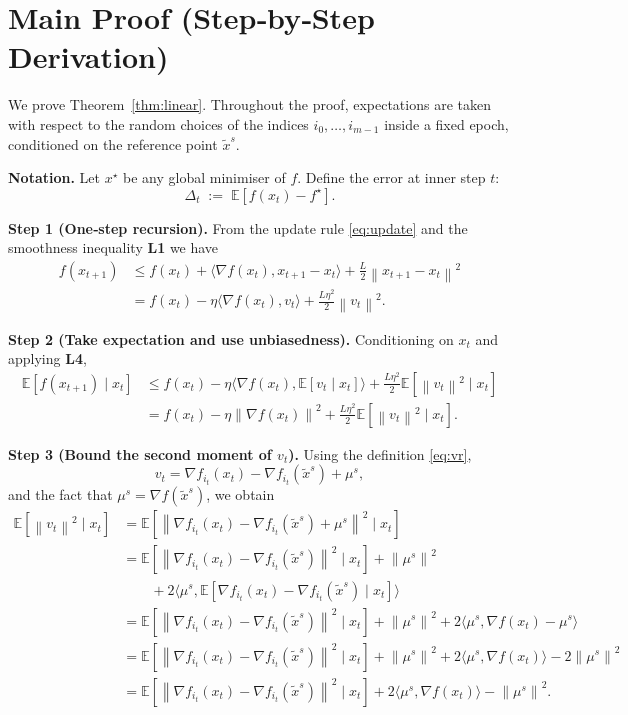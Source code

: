 \documentclass{article}
\newcommand{\E}{\mathbb{E}}
\newcommand{\norm}[1]{\left\|#1\right\|}
\newcommand{\inner}[2]{\langle #1,#2\rangle}
\newcommand{\grad}{\nabla}
\begin{document}
\section*{Main Proof (Step‑by‑Step Derivation)}
We prove Theorem~\ref{thm:linear}.  Throughout the proof, expectations are taken with respect to the random choices of the indices $i_0,\dots,i_{m-1}$ inside a fixed epoch, conditioned on the reference point $\tilde x^{s}$.

\bigskip
\noindent\textbf{Notation.}  Let $x^{\star}$ be any global minimiser of $f$.  Define the error at inner step $t$:
\[
\Delta_t \;:=\; \E\!\left[ f(x_t)-f^{\star}\right].
\]

\bigskip
\noindent\textbf{Step 1 (One‑step recursion).}  
From the update rule \eqref{eq:update} and the smoothness inequality \textbf{L1} we have
\[
\begin{aligned}
f(x_{t+1})
&\le f(x_t)+\inner{\grad f(x_t)}{x_{t+1}-x_t}
   +\frac{L}{2}\norm{x_{t+1}-x_t}^{2}\\
&= f(x_t)-\eta\inner{\grad f(x_t)}{v_t}
   +\frac{L\eta^{2}}{2}\norm{v_t}^{2}.
\end{aligned}
\tag{Step 1}
\]

\bigskip
\noindent\textbf{Step 2 (Take expectation and use unbiasedness).}  
Conditioning on $x_t$ and applying \textbf{L4},
\[
\begin{aligned}
\E\!\left[f(x_{t+1})\mid x_t\right]
&\le f(x_t)-\eta\inner{\grad f(x_t)}{\E[v_t\mid x_t]}
   +\frac{L\eta^{2}}{2}\E\!\left[\norm{v_t}^{2}\mid x_t\right]\\
&= f(x_t)-\eta\norm{\grad f(x_t)}^{2}
   +\frac{L\eta^{2}}{2}\E\!\left[\norm{v_t}^{2}\mid x_t\right].
\end{aligned}
\tag{Step 2}
\]

\bigskip
\noindent\textbf{Step 3 (Bound the second moment of $v_t$).}  
Using the definition \eqref{eq:vr},
\[
v_t = \grad f_{i_t}(x_t)-\grad f_{i_t}(\tilde x^{s})+\mu^{s},
\]
and the fact that $\mu^{s}= \grad f(\tilde x^{s})$, we obtain
\[
\begin{aligned}
\E\!\left[\norm{v_t}^{2}\mid x_t\right]
&= \E\!\left[\norm{\grad f_{i_t}(x_t)-\grad f_{i_t}(\tilde x^{s})+\mu^{s}}^{2}\mid x_t\right]\\
&= \E\!\left[\norm{\grad f_{i_t}(x_t)-\grad f_{i_t}(\tilde x^{s})}^{2}\mid x_t\right]
   +\norm{\mu^{s}}^{2}\\
&\qquad +2\inner{\mu^{s}}{\E\!\left[\grad f_{i_t}(x_t)-\grad f_{i_t}(\tilde x^{s})\mid x_t\right]}\\
&= \E\!\left[\norm{\grad f_{i_t}(x_t)-\grad f_{i_t}(\tilde x^{s})}^{2}\mid x_t\right]
   +\norm{\mu^{s}}^{2}
   +2\inner{\mu^{s}}{\grad f(x_t)-\mu^{s}}\\
&= \E\!\left[\norm{\grad f_{i_t}(x_t)-\grad f_{i_t}(\tilde x^{s})}^{2}\mid x_t\right]
   +\norm{\mu^{s}}^{2}
   +2\inner{\mu^{s}}{\grad f(x_t)}-2\norm{\mu^{s}}^{2}\\
&= \E\!\left[\norm{\grad f_{i_t}(x_t)-\grad f_{i_t}(\tilde x^{s})}^{2}\mid x_t\right]
   +2\inner{\mu^{s}}{\grad f(x_t)}-\norm{\mu^{s}}^{2}.
\end{aligned}
\tag{Step 3}
\]
\end{document}
